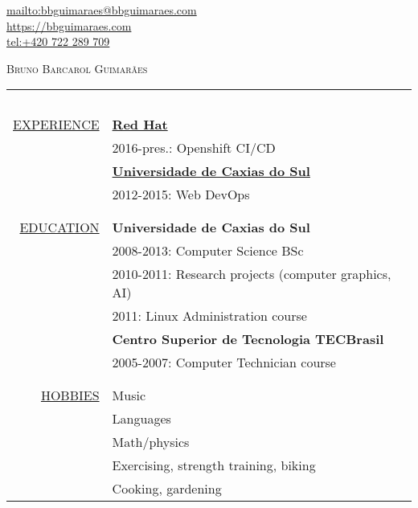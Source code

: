 \begin{flushright}
    \url{mailto:bbguimaraes@bbguimaraes.com} \\
    \url{https://bbguimaraes.com} \\
    \url{tel:+420 722 289 709}
\end{flushright}

\vspace{3\baselineskip}
{\Huge \textsc{Bruno Barcarol Guimarães}} \\
\bigskip

\begin{center}

\begin{tabular}{rl}
    \multicolumn{2}{c}{~\hspace{.95\textwidth}~} \\
    \hspace{5em}
    \hyperref[sec:professional]{\uppercase{Experience}}
    & \hyperref[subsec:redhat]{\textbf{Red Hat}} \\
    & 2016-pres.: Openshift CI/CD \\
    & \hyperref[subsec:ucs]{\textbf{Universidade de Caxias do Sul}} \\
    & 2012-2015: Web DevOps \\
    \\ \hline \\
    \hyperref[sec:education]{\uppercase{Education}}
    & \textbf{Universidade de Caxias do Sul} \\
    & 2008-2013: Computer Science BSc \\
    & 2010-2011: Research projects (computer graphics, AI) \\
    & 2011: Linux Administration course \\
    & \textbf{Centro Superior de Tecnologia TECBrasil} \\
    & 2005-2007: Computer Technician course \\
    \\ \hline \\
    \hyperref[sec:etc]{\uppercase{Hobbies}}
    & Music \\
    & Languages \\
    & Math/physics \\
    & Exercising, strength training, biking \\
    & Cooking, gardening
\end{tabular}

\end{center}
